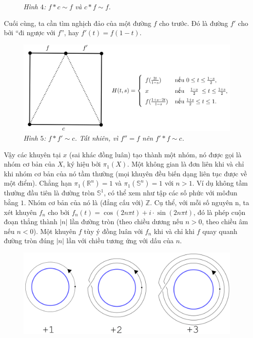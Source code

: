 \begin{multicols}{2}
\begin{figure}[H]
		\caption{\small\textit{\color{duongvaotoanhoc}Hình $4$: $f \ast c \sim f$ và $c \ast f \sim f$.}}
		\vspace*{-10pt}
	\end{figure}
	Cuối cùng, ta cần tìm nghịch đảo của một đường $f$ cho trước. Đó là đường $f'$ cho bởi ``đi ngược với $f$'', hay $f'(t) = f(1-t)$.
	\begin{figure}[H]
		\vspace*{-5pt}
		\centering
		\captionsetup{labelformat= empty, justification=centering}
		\includegraphics[width= 0.9\linewidth]{h5.png}
		\caption{\small\textit{\color{duongvaotoanhoc}Hình $5$: $f \ast f' \sim c$. Tất nhiên, vì $f'' = f$ nên $f' \ast f \sim c$.}}
		\vspace*{-10pt}
	\end{figure}
	Vậy các khuyên tại $x$ (sai khác đồng luân) tạo thành một nhóm, nó được gọi là nhóm cơ bản của $X$, ký hiệu bởi $\pi_1(X)$.
	\vskip 0.1cm
	Một không gian là đơn liên khi và chỉ khi nhóm cơ bản của nó tầm thường (mọi khuyên đều biến dạng liên tục được về một điểm). Chẳng hạn $\pi_1(\mathbb{R}^n) = 1$ và $\pi_1(\mathbb{S}^n) = 1$ với $n > 1$. Ví dụ không tầm thường đầu tiên là đường tròn $\mathbb{S}^1$, có thể xem như tập các số phức với môđun bằng $1$. Nhóm cơ bản của nó là (đẳng cấu với) $\mathbb{Z}$. Cụ thể, với mỗi số nguyên n, ta xét khuyên $f_n$ cho bởi $f_n(t) = \cos(2n \pi t)+i\cdot \sin(2n\pi t)$, đó là phép cuộn đoạn thẳng thành $|n|$ lần đường tròn (theo chiều dương nếu $n > 0$, theo chiều âm nếu $n < 0$). Một khuyên $f$ tùy ý đồng luân với $f_n$ khi và chỉ khi $f$ quay quanh đường tròn đúng $|n|$ lần với chiều tương ứng với dấu của $n$.
	\begin{figure}[H]
		\vspace*{-5pt}
		\centering
		\captionsetup{labelformat= empty, justification=centering}
		\includegraphics[width= 1\linewidth]{h6.png}

\end{figure}
\end{multicols}
